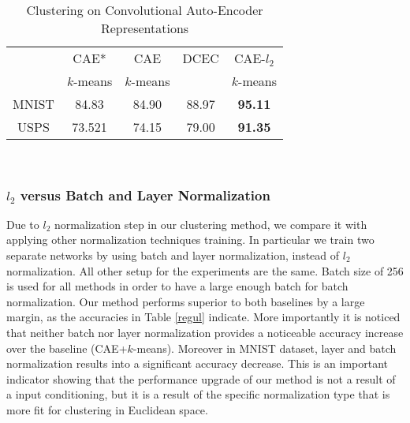 \documentclass[conference]{IEEEtran}
\begin{document}
\begin{table}[!t]

\caption{Clustering on Convolutional Auto-Encoder Representations}
\label{CAE}
\centering
\begin{adjustbox}{width=0.4\textwidth}

\begin{tabular}{|c|c|c|c|c|}
\hline
&CAE* & CAE & DCEC & CAE-$l_2$\\ 
&$k$-means & $k$-means &  & $k$-means\\ 

\hline
MNIST&84.83 & 84.90 & 88.97 & \textbf{95.11}\\
\hline
USPS&73.521 & 74.15 & 79.00 & \textbf{91.35}\\
\hline
\end{tabular}
\end{adjustbox}

\end{table}

\
\subsubsection*{$l_2$ versus Batch and Layer Normalization}

Due to $l_2$ normalization step in our clustering method, we compare it with applying other normalization techniques training. 
In particular we train two separate networks by using batch \cite{BNORM} and layer \cite{LNORM} normalization, instead of $l_2$ normalization.
All other setup for the experiments are the same.
Batch size of 256 is used for all methods in order to have a large enough batch for batch normalization.
Our method performs superior to both baselines by a large margin, as the accuracies in Table \ref{regul} indicate.
More importantly it is noticed that neither batch nor layer normalization provides a noticeable accuracy increase over the baseline (CAE+$k$-means).
Moreover in MNIST dataset, layer and batch normalization results into a significant accuracy decrease.
This is an important indicator showing that the performance upgrade of our method is not a result of a input conditioning, but it is a result of the specific normalization type that is more fit for clustering in Euclidean space.
\end{document}
